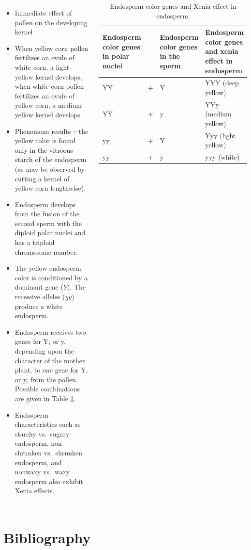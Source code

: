 \documentclass[11pt,ignorenonframetext,aspectratio=169]{beamer}
\providecommand{\tightlist}{%
  \setlength{\itemsep}{0pt}\setlength{\parskip}{0pt}}
\newcommand{\bcolumns}{\begin{columns}[T, onlytextwidth]}
\newcommand{\ecolumns}{\end{columns}}
\begin{document}
\begin{frame}{}
\protect\hypertarget{section-23}{}
\bcolumns
{}
\footnotesize

\begin{itemize}
\tightlist
\item
  Immediate effect of pollen on the developing kernel
\item
  When yellow corn pollen fertilizes an ovule of white corn, a
  light-yellow kernel develops; when white corn pollen fertilizes an
  ovule of yellow corn, a medium-yellow kernel develops.
\item
  Phenomena results \(\because\) the yellow color is found only in the
  vitreous starch of the endosperm (as may be observed by cutting a
  kernel of yellow corn lengthwise).
\item
  Endosperm develops from the fusion of the second sperm with the
  diploid polar nuclei and has a triploid chromosome number.
\item
  The yellow endosperm color is conditioned by a dominant gene (\(Y\)).
  The recessive alleles (\(yy\)) produce a white endosperm.
\item
  Endosperm receives two genes for Y, or y, depending upon the character
  of the mother plant, to one gene for Y, or y, from the pollen.
  Possible combinations are given in Table \ref{tab:xenia-effect}.
\item
  Endosperm characteristics such as starchy vs.~sugary endosperm,
  non-shrunken vs.~shrunken endosperm, and nonwaxy vs.~waxy endosperm
  also exhibit Xenia effects.
\end{itemize}


\begin{table}

\caption{\label{tab:xenia-effect}Endosperm color genes and Xenia effect in endosperm.}
\centering
\fontsize{5}{7}\selectfont
\begin{tabular}[t]{>{\raggedright\arraybackslash}p{6em}>{\raggedright\arraybackslash}p{2em}>{\raggedright\arraybackslash}p{7em}>{\raggedright\arraybackslash}p{8em}}
\toprule
Endosperm color genes in polar nuclei &   & Endosperm color genes in the sperm & Endosperm color genes and xenia effect in endosperm\\
\midrule
YY & + & Y & YYY (deep yellow)\\
YY & + & y & YYy (medium yellow)\\
yy & + & Y & Yyy (light yellow)\\
yy & + & y & yyy (white)\\
\bottomrule
\end{tabular}
\end{table}

\ecolumns
\end{frame}

\hypertarget{bibliography}{%
\section{Bibliography}\label{bibliography}}
\end{document}

